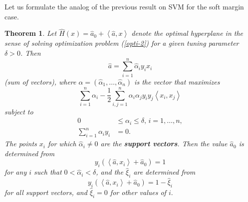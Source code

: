 \documentclass[11pt,twoside]{article}%
\theoremstyle{change}
\newtheorem{theorem}{Theorem}[section]
\begin{document}
Let us formulate the analog of the previous result on SVM for the soft margin
case.\newpage

\begin{theorem}
\label{theor-SVM-dual-optim-problem-2}Let $\hat{H}(x)=\hat{a}_{0}+\left\langle
\hat{a},x\right\rangle $ denote the optimal hyperplane in the sense of solving
optimization problem (\ref{opti-2}) for a given tuning parameter $\delta>0$.
Then
\[
\hat{a}=\sum_{i=1}^{n}\hat{\alpha}_{i}y_{i}x_{i}%
\]
(sum of vectors), where $\hat{\alpha}=\left(  \hat{\alpha}_{1},\ldots
,\hat{\alpha}_{n}\right)  $ is the vector that maximizes
\[
\sum_{i=1}^{n}\alpha_{i}-\frac{1}{2}\sum_{i,j=1}^{n}\alpha_{i}\alpha_{j}%
y_{i}y_{j}\left\langle x_{i},x_{j}\right\rangle
\]
subject to
\begin{align*}
0  & \leq\alpha_{i}\leq\delta\text{, }i=1,\ldots,n,\\
\sum_{i=1}^{n}\alpha_{i}y_{i}  & =0.
\end{align*}
The points $x_{i}$ for which $\hat{\alpha}_{i}\neq0$ are the \textbf{support
vectors}. Then the value $\hat{a}_{0}$ is determined from
\[
y_{i}\left(  \left\langle \hat{a},x_{i}\right\rangle +\hat{a}_{0}\right)  =1
\]
for any $i$ such that $0<\hat{\alpha}_{i}<\delta$, and the $\hat{\xi}_{i}$ are
determined from
\[
y_{i}\left(  \left\langle \hat{a},x_{i}\right\rangle +\hat{a}_{0}\right)
=1-\hat{\xi}_{i}%
\]
for all support vectors, and $\hat{\xi}_{i}=0$ for other values of $i.$
\end{theorem}
\end{document}
